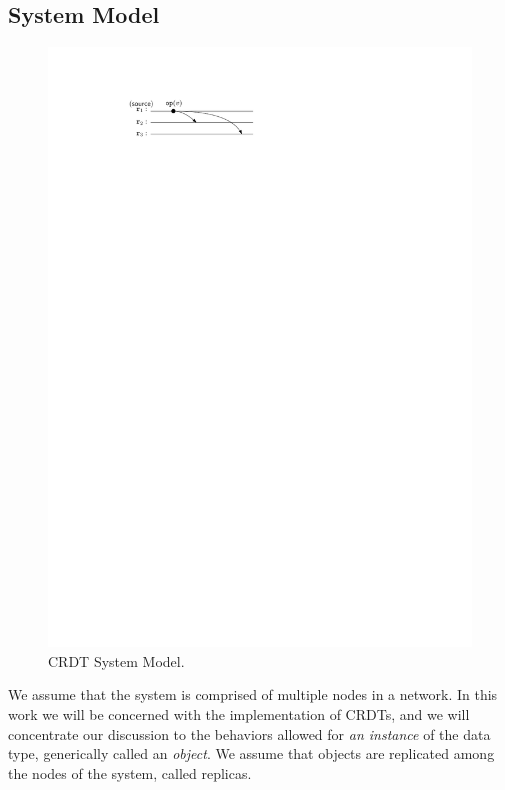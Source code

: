\subsection{System Model}
\begin{figure}
\vspace{-5mm}
  \centering
  \includegraphics[scale=.6]{figures/sys-mod}
  \vspace{-2mm}
  \caption{CRDT System Model.}
  \label{fig:sys-mod}
\vspace{-4mm}
\end{figure}
We assume that the system is comprised of multiple nodes in a network.
In this work we will be concerned with the implementation of CRDTs,
and we will concentrate our discussion to the behaviors
allowed for \emph{an instance} of the data type, generically called an
\emph{object}.
We assume that objects are replicated among the nodes of the system,
called replicas.

